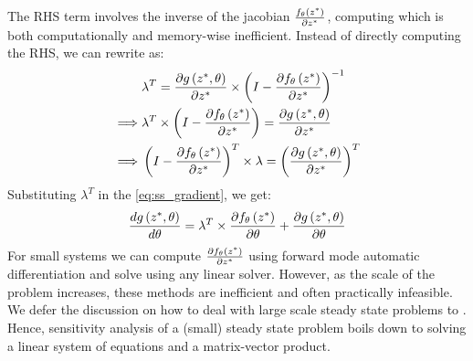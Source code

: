 %
The RHS term involves the inverse of the jacobian $\frac{f_\theta\left(z^*\right)}{\partial z^*}$, computing which is both computationally and memory-wise inefficient. Instead of directly computing the RHS, we can rewrite  as:
%
\begin{align}
           & \lambda^T = \frac{\partial g\left(z^*, \theta\right)}{\partial z^*} \times \left( I - \frac{\partial f_\theta\left(z^*\right)}{\partial z^*} \right)^{-1}                                       \\
  \implies & \lambda^T \times \left( I - \frac{\partial f_\theta\left(z^*\right)}{\partial z^*} \right) = \frac{\partial g\left(z^*, \theta\right)}{\partial z^*}                                            \\
  \implies & \left( I - \frac{\partial f_\theta\left(z^*\right)}{\partial z^*} \right)^T \times \lambda = \left(\frac{\partial g\left(z^*, \theta\right)}{\partial z^*}\right)^T \label{eq:ss_lambda_linear}
\end{align}
%
Substituting $\lambda^T$ in the \cref{eq:ss_gradient}, we get:
%
\begin{equation}
  \frac{d g\left(z^*, \theta\right)}{d \theta} = \lambda^T \times \frac{\partial f_\theta\left(z^*\right)}{\partial \theta} + \frac{\partial g\left(z^*, \theta\right)}{\partial \theta} \label{eq:ss_total_gradient}
\end{equation}
%
For small systems we can compute $\frac{\partial f_\theta\left(z^*\right)}{\partial z^*}$ using forward mode automatic differentiation and solve  using any linear solver. However, as the scale of the problem increases, these methods are inefficient and often practically infeasible. We defer the discussion on how to deal with large scale steady state problems to . Hence, sensitivity analysis of a (small) steady state problem boils down to solving a linear system of equations and a matrix-vector product.


